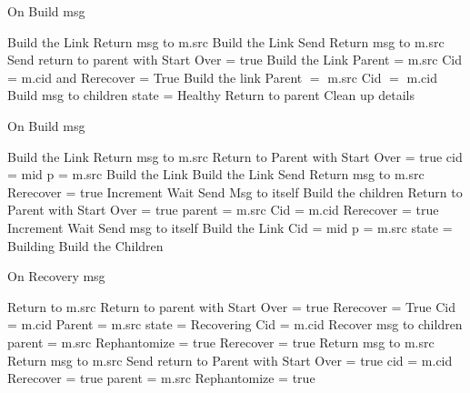 \documentclass{article}
\begin{document}
	
\begin{algorithm}
\caption{On Build msg}
\label{Build message received}
\begin{algorithmic}[1]
	\State Build the Link
	\State Return msg to m.src
		\State Build the Link
		\State Send Return msg to m.src
	\Else
						\State Send return to parent with Start Over = true
		\EndIf
		\State Build the Link
		\State Parent = m.src
		\State Cid = m.cid and Rerecover = True
	\EndIf
{}
	\State Build the link
	\State Parent $=$ m.src
	\State Cid $=$ m.cid
		\State Build msg to children
	\Else
		\State state = Healthy
		\State Return to parent
		\State Clean up details
	\EndIf
{}
\end{algorithmic}
\end{algorithm}	


\begin{algorithm}
\caption{On Build msg}
\label{Build message received}
\begin{algorithmic}[1]
		\State Build the Link
		\State Return msg to m.src
	\Else
			\State Return to Parent with Start Over = true
		\EndIf
		\State cid = mid
		\State p = m.src
		\State Build the Link
	\EndIf
{}
		\State Build the Link
		\State Send Return msg to m.src
		\State Rerecover = true
		\State Increment Wait
		\State Send Msg to itself
	\Else
		\State Build the children
			\State Return to Parent with Start Over = true
		\EndIf
		\State parent = m.src
		\State Cid = m.cid
		\State Rerecover = true
		\State Increment Wait
		\State Send msg to itself
	\EndIf
{}
	\State Build the Link
	\State Cid = mid
	\State p = m.src
	\State state = Building
	\State Build the Children
\EndIf
\EndProcedure
\end{algorithmic}
\end{algorithm}	

\begin{algorithm}
\caption{On Recovery msg}
\label{Recovery message received}
\begin{algorithmic}[1]
	\State Return to m.src
		\State Return to parent with Start Over = true
	\EndIf
	\State Rerecover = True
	\State Cid = m.cid
	\State Parent = m.src
	\State state = Recovering
	\State Cid = m.cid
	\State Recover msg to children
	\State parent = m.src
		\State Rephantomize = true
		\State Rerecover = true
		\State Return msg to m.src
		\State Return msg to m.src
	\Else
			\State Send return to Parent with Start Over = true
		\EndIf
		\State cid = m.cid
		\State Rerecover = true
		\State parent = m.src
		\State Rephantomize = true
	\EndIf
{}
\end{algorithmic}
\end{algorithm}	
\end{document}

